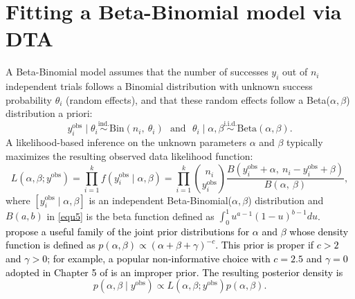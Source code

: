 \documentclass[12pt]{article}
\begin{document}
\section{Fitting a Beta-Binomial model via DTA}\label{sec4}


A Beta-Binomial model \citep{skellam1948} assumes that the number of successes $y_i$ out of $n_i$ independent trials follows a Binomial distribution with unknown success probability $\theta_i$ (random effects), and that these random effects follow a Beta($\alpha, \beta$) distribution a priori:
\begin{equation}\label{equ4}
y^{\textrm{obs}}_i\mid \theta_i\stackrel{\textrm{ind.}}{\sim} \textrm{Bin}(n_i,~ \theta_i)~~~\textrm{and}~~~\theta_i\mid \alpha, \beta \stackrel{\textrm{i.i.d.}}{\sim} \textrm{Beta}(\alpha, \beta).
\end{equation}
A likelihood-based inference on the unknown parameters $\alpha$ and $\beta$ typically maximizes the resulting observed data likelihood function: 
\begin{equation}\label{equ5}
L(\alpha, \beta; y^{\textrm{obs}})=\prod_{i=1}^k f(y^{\textrm{obs}}_i\mid \alpha, \beta)=\prod_{i=1}^k \binom{n_i}{y^{\textrm{obs}}_i}\frac{B(y^{\textrm{obs}}_i+\alpha, ~n_i-y^{\textrm{obs}}_i+\beta)}{B(\alpha, ~\beta)},\end{equation}
where $[y^{\textrm{obs}}_i \mid \alpha, \beta]$ is an independent Beta-Binomial($\alpha, \beta$) distribution and $B(a, b)$ in \eqref{equ5} is the beta function defined as $\int_0^1u^{a-1}(1-u)^{b-1}du$. \textcolor{black}{\cite{everson2002betabin} propose a useful family of the joint prior distributions for $\alpha$ and $\beta$ whose density function is defined as $p(\alpha, \beta)\propto(\alpha+\beta+\gamma)^{-c}$. This prior is proper if $c>2$ and $\gamma>0$; for example, a popular non-informative choice with $c=2.5$ and $\gamma=0$ adopted in Chapter 5 of \cite{gelman2013bayesian} is an improper prior. The resulting posterior density is}
\begin{equation}\label{post.betabin}
p(\alpha, \beta\mid y^{\textrm{obs}})\propto L(\alpha, \beta; y^{\textrm{obs}})p(\alpha, \beta).
\end{equation}
\end{document}
